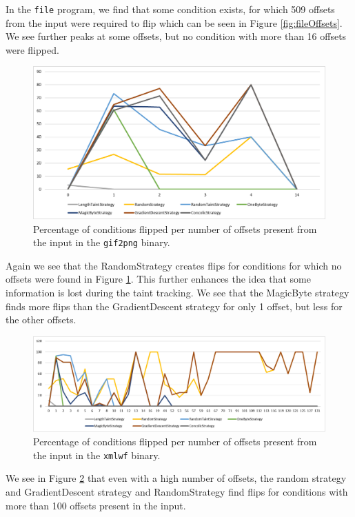 In the \texttt{file} program, we find that some condition exists, for which 509 offsets from the input were required to flip which can be seen in Figure \ref{fig:fileOffsets}. We see further peaks at some offsets, but no condition with more than 16 offsets were flipped.
\begin{figure}[H]
    \centering
    \includegraphics[width=.8\linewidth]{5_results/graphs/gif2png-offsets.png}  
    \caption{Percentage of conditions flipped per number of offsets present from the input in the \texttt{gif2png} binary.}
    \label{fig:gif2pngOffsets}
\end{figure}
Again we see that the RandomStrategy creates flips for conditions for which no offsets were found in Figure \ref{fig:gif2pngOffsets}. This further enhances the idea that some information is lost during the taint tracking. We see that the MagicByte strategy finds more flips than the GradientDescent strategy for only 1 offset, but less for the other offsets.
\begin{figure}[H]
    \centering
    \includegraphics[width=.8\linewidth]{5_results/graphs/xmlwf-offsets.png}  
    \caption{Percentage of conditions flipped per number of offsets present from the input in the \texttt{xmlwf} binary.}
    \label{fig:xmlwfOffsets}
\end{figure}
We see in Figure \ref{fig:xmlwfOffsets} that even with a high number of offsets, the random strategy and GradientDescent strategy and RandomStrategy find flips for conditions with more than 100 offsets present in the input.
